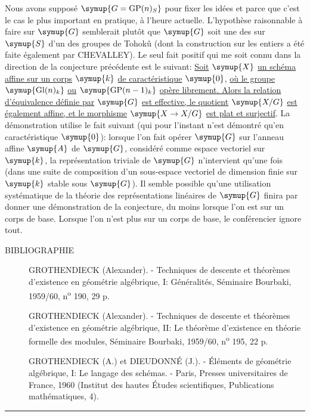 \medskip
{} Nous avons supposé
$\symup{G=\operatorname{GP}(n)_S}$ pour fixer les idées et parce que c'est le cas le
plus important en pratique, à l'heure actuelle. L'hypothèse raisonnable à
faire sur $\symup{G}$ semblerait plutôt que $\symup{G}$ soit une des  sur $\symup{S}$ d'un
des groupes de Tohokû (dont la construction sur les entiers a été faite
également par CHEVALLEY). Le seul fait positif qui me soit connu dans la
direction de la conjecture précédente est le suivant: \uline{Soit} $\symup{X}$ \uline{un schéma
affine sur un corps} $\symup{k}$ \uline{de caractéristique} $\symup{0}$, \uline{où le groupe}
$\symup{\operatorname{Gl}(n)_k}$ \uline{ou} $\symup{\operatorname{GP}(n-1)_k}$ \uline{opère librement. Alors
la relation d'équivalence définie par} $\symup{G}$ \uline{est effective, le quotient} $\symup{X/G}$ \uline{est
également affine, et le morphisme} $\symup{X\to X/G}$ \uline{est plat et surjectif}. La
démonstration utilise le fait suivant (qui pour l'instant n'est démontré qu'en
caractéristique $\symup{0}$): lorsque l'on fait opérer $\symup{G}$ sur l'anneau affine $\symup{A}$ de
$\symup{G}$, considéré comme espace vectoriel sur $\symup{k}$, la représentation triviale de
$\symup{G}$ n'intervient qu'une fois (dans une suite de composition d'un sous-espace
vectoriel de dimension finie sur $\symup{k}$ stable sous $\symup{G}$). Il semble possible
qu'une utilisation systématique de la
théorie des représentations linéaires de $\symup{G}$ finira par donner une
démonstration de la conjecture, du moins lorsque l'on est sur un corps de base.
Lorsque l'on n'est plus sur un corps de base, le conférencier ignore tout.

\begin{center}BIBLIOGRAPHIE\end{center}

\begin{description}
\item[{\normalfont[1]}] GROTHENDIECK (Alexander). - Techniques de descente et théorèmes
d'existence en géométrie algébrique, I: Généralités, Séminaire Bourbaki,
1959/60, n\textsuperscript{o} 190, 29 p.

\item[{\normalfont[2]}] GROTHENDIECK (Alexander). - Techniques de descente et théorèmes
d'existence en géométrie algébrique, II: Le théorème d'existence en théorie
formelle des modules, Séminaire Bourbaki, 1959/60,
n\textsuperscript{o} 195, 22 p.

\item[{\normalfont[3]}] GROTHENDIECK (A.) et DIEUDONNÉ (J.). - Éléments de géométrie
algébrique, I: Le langage des schémas. - Paris, Presses universitaires de
France, 1960 (Institut des hautes Études scientifiques, Publications
mathématiques, 4).
\end{description}

\begin{center}
  \rule{.14\linewidth}{.3pt}
\end{center}
